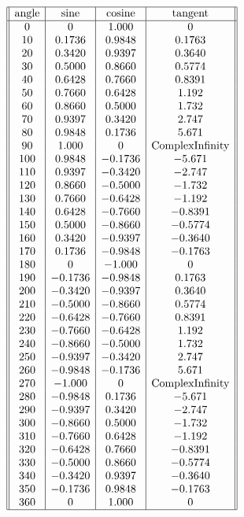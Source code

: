 \documentclass[12pt]{book}
\begin{document}
\begin{enumerate}
\begin{enumerate}
{$$
\begin{array}{||c|c|c|c||}
\hline
 \text{angle} & \text{sine} & \text{cosine} & \text{tangent} \\
 \hline
 0 & 0 & 1.000 & 0 \\
 10 & 0.1736 & 0.9848 & 0.1763 \\
 20 & 0.3420 & 0.9397 & 0.3640 \\
 30 & 0.5000 & 0.8660 & 0.5774 \\
 40 & 0.6428 & 0.7660 & 0.8391 \\
 50 & 0.7660 & 0.6428 & 1.192 \\
 60 & 0.8660 & 0.5000 & 1.732 \\
 70 & 0.9397 & 0.3420 & 2.747 \\
 80 & 0.9848 & 0.1736 & 5.671 \\
 90 & 1.000 & 0 & \text{ComplexInfinity} \\
 100 & 0.9848 & -0.1736 & -5.671 \\
 110 & 0.9397 & -0.3420 & -2.747 \\
 120 & 0.8660 & -0.5000 & -1.732 \\
 130 & 0.7660 & -0.6428 & -1.192 \\
 140 & 0.6428 & -0.7660 & -0.8391 \\
 150 & 0.5000 & -0.8660 & -0.5774 \\
 160 & 0.3420 & -0.9397 & -0.3640 \\
 170 & 0.1736 & -0.9848 & -0.1763 \\
 180 & 0 & -1.000 & 0 \\
 190 & -0.1736 & -0.9848 & 0.1763 \\
 200 & -0.3420 & -0.9397 & 0.3640 \\
 210 & -0.5000 & -0.8660 & 0.5774 \\
 220 & -0.6428 & -0.7660 & 0.8391 \\
 230 & -0.7660 & -0.6428 & 1.192 \\
 240 & -0.8660 & -0.5000 & 1.732 \\
 250 & -0.9397 & -0.3420 & 2.747 \\
 260 & -0.9848 & -0.1736 & 5.671 \\
 270 & -1.000 & 0 & \text{ComplexInfinity} \\
 280 & -0.9848 & 0.1736 & -5.671 \\
 290 & -0.9397 & 0.3420 & -2.747 \\
 300 & -0.8660 & 0.5000 & -1.732 \\
 310 & -0.7660 & 0.6428 & -1.192 \\
 320 & -0.6428 & 0.7660 & -0.8391 \\
 330 & -0.5000 & 0.8660 & -0.5774 \\
 340 & -0.3420 & 0.9397 & -0.3640 \\
 350 & -0.1736 & 0.9848 & -0.1763 \\
 360 & 0 & 1.000 & 0 \\
 \hline
\end{array}
$$

}
\end{enumerate}
\end{enumerate}
\end{document}
